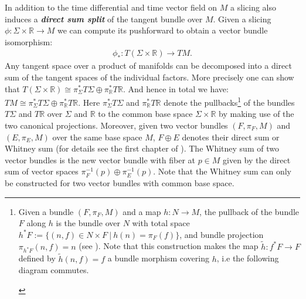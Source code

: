 In addition to the time differential and time vector field on $M$ a slicing also induces a \textbf{\textit{direct sum split}} of the tangent bundle over $M$. Given a slicing $\phi : \Sigma \times \mathbb{R} \rightarrow M$ we can compute its pushforward to obtain a vector bundle isomorphism:
\begin{align}
\phi_{\ast}: T(\Sigma \times \mathbb{R}) \longrightarrow TM.
\end{align}
Any tangent space over a product of manifolds can be decomposed into a direct sum of the tangent spaces of the individual factors. More precisely one can show that $T(\Sigma \times \mathbb{R}) \cong \pi_{\Sigma}^{\ast}T\Sigma \oplus \pi_{\mathbb{R}}^{\ast} T\mathbb{R}$. And hence in total we have: $TM \cong \pi_{\Sigma}^{\ast}T\Sigma \oplus \pi_{\mathbb{R}}^{\ast} T\mathbb{R}$.
Here $\pi_{\Sigma}^{\ast}T\Sigma$ and $\pi_{\mathbb{R}}^{\ast}T\mathbb{R}$ denote the pullbacks\footnote{Given a bundle $(F,\pi_F,M)$ and a map $h: N \rightarrow M$, the pullback of the bundle $F$ along $h$ is the bundle over $N$ with total space $h^{\ast}F := \{ (n,f) \in N \times F \ \vert \  h(n) = \pi_F(f)\}$, and bundle projection $\pi_{h^{\ast}F}(n,f) = n$ (see \cite{doi:10.1142/3867}). Note that this construction makes the map $\tilde{h}: f^{\ast}F \rightarrow F$ defined by $\tilde{h}(n,f) = f$ a bundle morphism covering $h$, i.e the following diagram commutes. 
\begin{center}
\end{center}} of the bundles $T\Sigma$ and $T\mathbb{R}$ over $\Sigma$ and $\mathbb{R}$ to the common base space $\Sigma \times \mathbb{R}$ by making use of the two canonical projections.
Moreover, given two vector bundles $(F,\pi_F,M)$ and $(E,\pi_E,M)$ over the same base space $M$, $F\oplus E$ denotes their direct sum or Whitney sum (for details see the first chapter of \cite{nla.cat-vn705150}). The Whitney sum of two vector bundles is the new vector bundle with fiber at $p \in M$ given by the direct sum of vector spaces $\pi_F^{-1}(p) \oplus \pi_E^{-1}(p)$. 
Note that the Whitney sum can only be constructed for two vector bundles with common base space.
